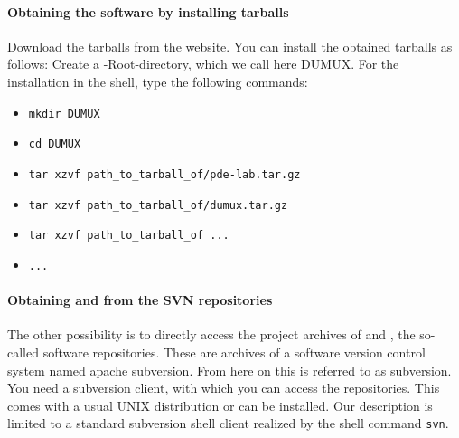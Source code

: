 \paragraph{Obtaining the software by installing tarballs}
Download the tarballs from the website. You can install the obtained tarballs as follows: Create a \Dune-Root-directory, which we call here DUMUX. For the installation in the shell, type the following commands: 
\begin{itemize}
\item \texttt{mkdir DUMUX}
\item \texttt{cd DUMUX}
\item \texttt{tar xzvf path\_to\_tarball\_of/pde-lab.tar.gz}
\item \texttt{tar xzvf path\_to\_tarball\_of/dumux.tar.gz}
\item \texttt{tar xzvf path\_to\_tarball\_of ...}
\item \texttt{...}
\end{itemize} 

\paragraph{Obtaining \Dune and \Dumux from the SVN repositories} 
The other possibility is to directly access the project archives of \Dune and \Dumux, the so-called software repositories. These are archives of a software version control system named apache subversion. From here on this is referred to as subversion.
You need a subversion client, with which you can access the repositories. This comes with a usual UNIX distribution or can be installed. Our description is limited to a standard subversion shell client realized by the shell command \texttt{svn}.

